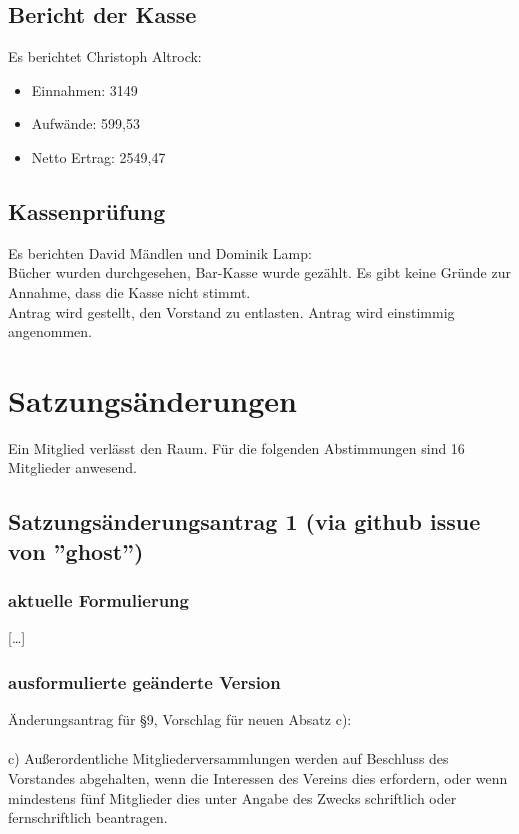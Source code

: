 \documentclass[a4paper]{scrartcl}
\begin{document}
\subsection{Bericht der Kasse}
Es berichtet Christoph Altrock:\\
\begin{itemize}
\item Einnahmen: 3149 \texteuro
\item Aufwände: 599,53 \texteuro
\item Netto Ertrag: 2549,47 \texteuro
\end{itemize}
\subsection{Kassenprüfung}
Es berichten David Mändlen und Dominik Lamp:\\
Bücher wurden durchgesehen, Bar-Kasse wurde gezählt. Es gibt keine Gründe zur Annahme, dass die Kasse nicht stimmt.\\
Antrag wird gestellt, den Vorstand zu entlasten. Antrag wird einstimmig angenommen.

\section{Satzungsänderungen}
Ein Mitglied verlässt den Raum. Für die folgenden Abstimmungen sind 16 Mitglieder anwesend.

\subsection{Satzungsänderungsantrag 1 (via github issue von ''ghost'')}
\subsubsection{aktuelle Formulierung}

{[}\dots{]}\\

\subsubsection{ausformulierte geänderte Version}

Änderungsantrag für §9, Vorschlag für neuen Absatz c):\\
\\
c) Außerordentliche Mitgliederversammlungen werden auf Beschluss des Vorstandes abgehalten, wenn die Interessen des Vereins dies erfordern, oder wenn mindestens fünf Mitglieder dies unter Angabe des Zwecks schriftlich oder fernschriftlich beantragen.
\end{document}
